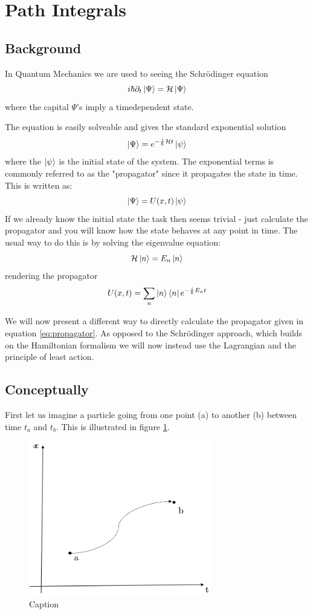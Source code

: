 \documentclass[a4,10pt,titlepage]{article}
\renewcommand\[{\begin{equation*}}
\renewcommand\]{\end{equation*}}
\newcommand{\be}{\begin{equation}}
\newcommand{\ee}{\end{equation}}
\numberwithin{equation}{section}
\newcommand{\ham}{\mathcal{H}}
\begin{document}
\section{Path Integrals}
\subsection{Background}
In Quantum Mechanics we are used to seeing the Schrödinger equation
\be
i\hbar \partial_t\ket{\Psi}=\ham \ket{\Psi}
\ee
where the capital $\Psi$'s imply a timedependent state. 

The equation is easily solveable and gives the standard exponential solution
\be
\ket{\Psi}=e^{-\frac{i}{\hbar}\ham t}\ket{\psi}
\ee
where the $\ket{\psi}$ is the initial state of the system. The exponential terms is commonly referred to as the "propagator" since it propagates the state in time. This is written as:
\be
\ket{\Psi}=U(x,t)\ket{\psi} 
\ee
If we already know the initial state the task then seems trivial - just calculate the propagator and you will know how the state behaves at any point in time. The usual way to do this is by solving the eigenvalue equation:
\be \label{eq:propagator}
\ham\ket{n}=E_n\ket{n}
\ee
rendering the propagator
\be
U(x,t)=\sum_n\ket{n}\bra{n}e^{-\frac{i}{\hbar}E_nt}
\ee

We will now present a different way to directly calculate the propagator given in equation \ref{eq:propagator}. As opposed to the Schrödinger approach, which builds on the Hamiltonian formalism we will now instead use the Lagrangian and the principle of least action.
\subsection{Conceptually}
First let us imagine a particle going from one point (a) to another (b) between time $t_a$ and $t_b$. This is illustrated in figure \ref{fig:my_label4}.
\begin{figure}[htb]
    \centering
    \includegraphics[width=8cm]{Pathint.PNG}
    \caption{Caption}
    \label{fig:my_label4}
\end{figure}
\end{document}
